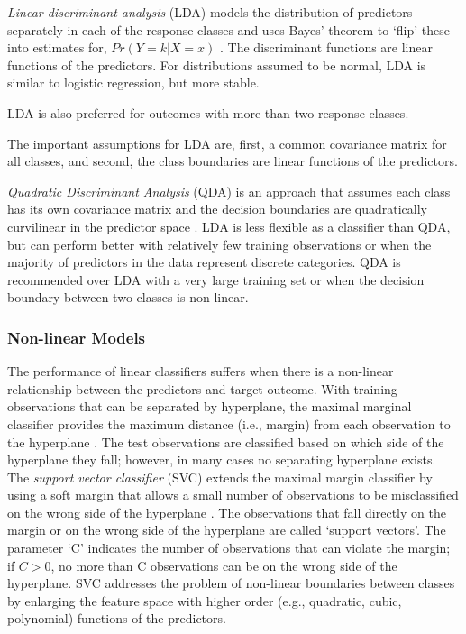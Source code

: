 \documentclass[sigconf]{acmart}
\begin{document}
\emph{Linear discriminant analysis} (LDA) models the distribution of predictors 
separately in each of the response classes and uses Bayes' theorem to `flip' 
these into estimates for, $Pr(Y=k | X=x)$ \cite{james13}. The discriminant 
functions are linear functions of the predictors. For distributions assumed to 
be normal, LDA is similar to logistic regression, but more stable. 

LDA is also preferred for outcomes with more than two response classes. 

The important assumptions for LDA are, first, a common covariance 
matrix for all classes, and second, the class boundaries are linear functions 
of the predictors. 

\emph{Quadratic Discriminant Analysis} (QDA) is an approach 
that assumes each class has its own covariance matrix and the decision 
boundaries are quadratically curvilinear in the predictor space \cite{kuhn13}. 
LDA is less flexible as a classifier than QDA, but can perform better with 
relatively few training observations or when the majority of predictors in the 
data represent discrete categories. QDA is recommended over LDA with a very 
large training set or when the decision boundary between two classes is 
non-linear. 


\subsubsection{Non-linear Models}

The performance of linear classifiers suffers when there is a non-linear 
relationship between the predictors and target outcome. With training
observations that can be separated by hyperplane, the maximal marginal 
classifier provides the maximum distance (i.e., margin) from each observation
to the hyperplane \cite{james13}. The test observations are classified based 
on which side of the hyperplane they fall; however, in many cases no separating 
hyperplane exists. The \emph{support vector classifier} (SVC) extends the 
maximal margin classifier by using a soft margin that allows a small number 
of observations to be misclassified on the wrong side of the hyperplane 
\cite{kuhn13, cortes95}. The observations that fall directly on the margin or 
on the wrong side of the hyperplane are called `support vectors'. The parameter 
`C' indicates the number of observations that can violate the margin; if $C>0$, 
no more than C observations can be on the wrong side of the hyperplane. 
SVC addresses the problem of non-linear boundaries between classes by 
enlarging the feature space with higher order (e.g., quadratic, cubic, 
polynomial) functions of the predictors. 
\end{document}

